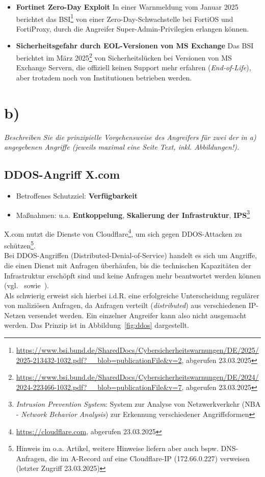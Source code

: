 \begin{itemize}
    \item \textbf{Fortinet Zero-Day Exploit} In einer Warnmeldung vom Januar 2025 berichtet das BSI\footnote{
        \url{https://www.bsi.bund.de/SharedDocs/Cybersicherheitswarnungen/DE/2025/2025-213432-1032.pdf?__blob=publicationFile&v=2}, abgerufen 23.03.2025
    } von einer Zero-Day-Schwachstelle bei FortiOS und FortiProxy, durch die Angreifer Super-Admin-Privilegien erlangen können.
    \item \textbf{Sicherheitsgefahr durch EOL-Versionen von MS Exchange} Das BSI berichtet im März 2025\footnote{
        \url{https://www.bsi.bund.de/SharedDocs/Cybersicherheitswarnungen/DE/2024/2024-223466-1032.pdf?__blob=publicationFile&v=7}, abgerufen 23.03.2025
    } von Sicherheitslücken bei Versionen von MS Exchange Servern, die offiziell keinen Support mehr erfahren (\textit{End-of-Life}), aber trotzdem noch von Institutionen betrieben werden.
\end{itemize}

\section{b)}
\textit{Beschreiben Sie die prinzipielle Vorgehensweise des Angreifers für zwei der in a) angegebenen Angriffe (jeweils maximal eine Seite Text, inkl. Abbildungen!).}

\subsection*{DDOS-Angriff X.com}

\begin{itemize}
    \itemsep0.5em
    \item Betroffenes Schutzziel: \textbf{Verfügbarkeit}
    \item Maßnahmen: u.a. \textbf{Entkoppelung}, \textbf{Skalierung der Infrastruktur}, \textbf{IPS}\footnote{
        \textit{Intrusion Prevention System}: System zur Analyse von Netzwerkverkehr (NBA - \textit{Network Behavior Analysis}) zur Erkennung verschiedener Angriffsformen
    }
\end{itemize}

\noindent
X.com nutzt die Dienste von Cloudflare\footnote{
    \url{https://cloudflare.com}, abgerufen 23.03.2025
}, um sich gegen DDOS-Attacken zu schützen\footnote{
    Hinweis im o.a. Artikel, weitere Hinweise liefern aber auch bspw. DNS-Anfragen, die im A-Record auf eine Cloudflare-IP (172.66.0.227) verweisen (letzter Zugriff 23.03.2025)
}.\\
Bei DDOS-Angriffen (Distributed-Denial-of-Service) handelt es sich um Angriffe, die einen Dienst mit Anfragen überhäufen, bis die technischen Kapazitäten der Infrastruktur erschöpft sind und keine Anfragen mehr beantwortet werden können (vgl.~\cite[120 ff.]{Eck18} sowie~\cite[533 ff.]{SL05}).\\
Als schwierig erweist sich hierbei i.d.R. eine erfolgreiche Unterscheidung regulärer von maliziösen Anfragen, da Anfragen verteilt (\textit{distributed}) aus verschiedenen IP-Netzen versendet werden.
Ein einzelner Angreifer kann also nicht ausgemacht werden.
Das Prinzip ist in Abbildung~\ref{fig:ddos} dargestellt.\\


